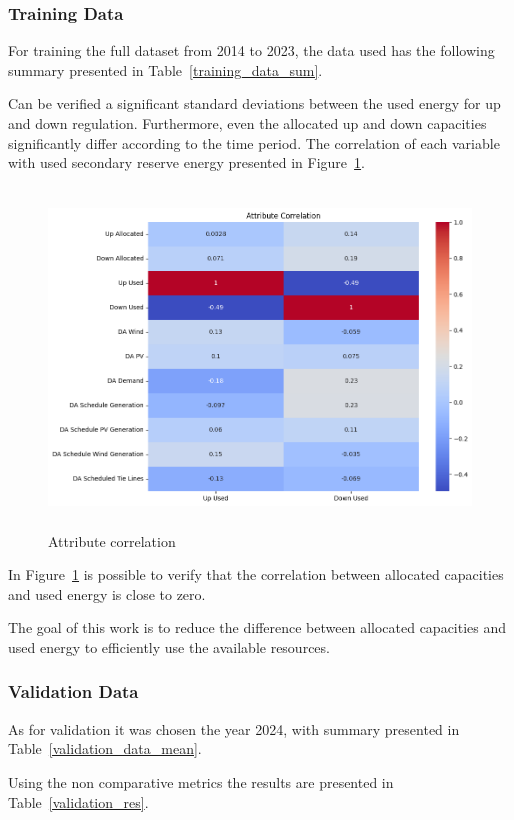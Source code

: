 \subsubsection{Training Data}
For training the full dataset from 2014 to 2023, the data used has the following summary presented in Table~\ref{training_data_sum}.



Can be verified a significant standard deviations between the used energy for up and down regulation. Furthermore, even the allocated up and down capacities significantly differ according to the time period. 
%
The correlation of each variable with used secondary reserve energy presented in Figure~\ref{fig:Attribute_correlation}.

\begin{figure}[H]
    \centering
    \includegraphics[height=9cm, keepaspectratio=true]{plots/correlation_heatmap.png}
    \caption{Attribute correlation}
    \label{fig:Attribute_correlation}
  \end{figure}
  
 In Figure~\ref{fig:Attribute_correlation} is possible to verify that the correlation between allocated capacities and used energy is close to zero.  
  
The goal of this work is to reduce the difference between allocated capacities and used energy to efficiently use the available resources.

\subsubsection{Validation Data}
As for validation it was chosen the year 2024, with summary presented in Table~\ref{validation_data_mean}.\par

Using the non comparative metrics the results are presented in Table~\ref{validation_res}.

